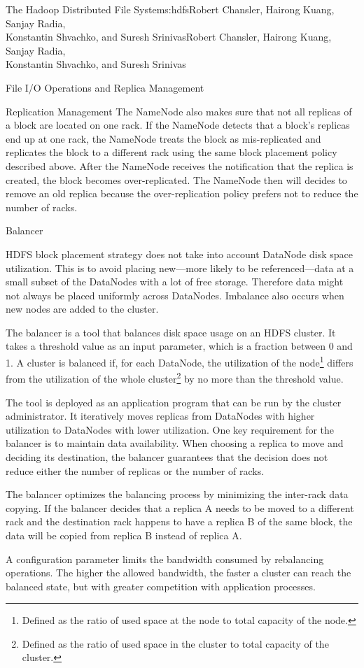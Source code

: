 \begin{aosachaptertoc}{The Hadoop Distributed File System}{s:hdfs}{Robert Chansler, Hairong Kuang, Sanjay Radia, \\ Konstantin Shvachko, and Suresh Srinivas}{Robert Chansler, Hairong Kuang, Sanjay Radia, \\ \hspace*{0.9cm} Konstantin Shvachko, and Suresh Srinivas}
\begin{aosasect1}{File I/O Operations and Replica Management}
\begin{aosasect2}{Replication Management}
The NameNode also makes sure that not all replicas of a block are
located on one rack. If the NameNode detects that a block's replicas
end up at one rack, the NameNode treats the block as mis-replicated
and replicates the block to a different rack using the same block
placement policy described above. After the NameNode receives the
notification that the replica is created, the block becomes
over-replicated. The NameNode then will decides to remove an old
replica because the over-replication policy prefers not to reduce the
number of racks.

\end{aosasect2}

\begin{aosasect2}{Balancer}

HDFS block placement strategy does not take into account DataNode disk
space utilization. This is to avoid placing new---more likely to be
referenced---data at a small subset of the DataNodes with a lot of
free storage. Therefore data might not always be placed uniformly
across DataNodes. Imbalance also occurs when new nodes are added to
the cluster.

The balancer is a tool that balances disk space usage on an HDFS
cluster. It takes a threshold value as an input parameter, which is a
fraction between 0 and 1. A cluster is balanced if, for each DataNode,
the utilization of the node\footnote{Defined as the ratio of used
space at the node to total capacity of the node.} differs from the
utilization of the whole cluster\footnote{Defined as the ratio of used
space in the cluster to total capacity of the cluster.} by no more
than the threshold value.

The tool is deployed as an application program that can be run by the
cluster administrator. It iteratively moves replicas from DataNodes
with higher utilization to DataNodes with lower utilization. One key
requirement for the balancer is to maintain data availability. When
choosing a replica to move and deciding its destination, the balancer
guarantees that the decision does not reduce either the number of
replicas or the number of racks.

The balancer optimizes the balancing process by minimizing the
inter-rack data copying. If the balancer decides that a replica A
needs to be moved to a different rack and the destination rack happens
to have a replica B of the same block, the data will be copied from
replica B instead of replica A.

A configuration parameter limits the bandwidth consumed by rebalancing
operations. The higher the allowed bandwidth, the faster a cluster can
reach the balanced state, but with greater competition with
application processes.


\end{aosasect2}
\end{aosasect1}
\end{aosachaptertoc}
